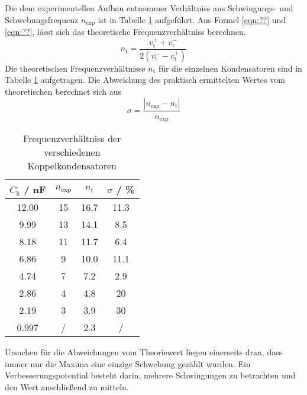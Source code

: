 Die dem experimentellen Aufbau entnommer Verhältniss aus Schwingungs- und Schwebungsfrequenz $n_\text{exp}$ ist in Tabelle \ref{tab:n} aufgeführt. Aus Formel \ref{eqn:??} und \ref{eqn:??}, lässt sich das theoretische Frequenzverhältniss berechnen.
\begin{equation}
  n_\text{t} = \frac{ v_\text{t}^+ + v_\text{t}^- }{2(v_\text{t}^- - v_\text{t}^+)}
  \label{eqn:n_t}
\end{equation}
Die theoretischen Frequenzverhältnisse $n_\text{t}$ für die einzelnen Kondensatoren sind in Tabelle \ref{tab:n} aufgetragen. Die Abweichung des praktisch ermittelten Wertes vom theoretischen berechnet sich aus 
\begin{equation}
  \sigma = \frac{| n_\text{exp} - n_\text{t} |}{n_\text{exp}}
\end{equation}
\begin{table}
  \centering
  \begin{tabular}{c c c c}
    \toprule
    $C_\text{k}$ / nF & $n_\text{exp}$ & $n_\text{t}$ & $\sigma$ / \%	\\
    \midrule
    12.00	& 15	& 16.7	& 11.3	\\
    9.99	& 13 	& 14.1	& 8.5	\\
    8.18	& 11	& 11.7	& 6.4	\\
    6.86	& 9	& 10.0	& 11.1	\\
    4.74	& 7	& 7.2	& 2.9	\\
    2.86	& 4	& 4.8	& 20	\\	
    2.19	& 3 	& 3.9	& 30	\\
    0.997	& /	& 2.3	& /	\\
    \bottomrule
  \end{tabular}
  \caption{Frequenzverhältniss der verschiedenen Koppelkondensatoren}
  \label{tab:n}
\end{table}
Ursachen für die Abweichungen vom Theoriewert liegen einerseits dran, dass immer nur die Maxima eine einzige Schwebung gezählt wurden. Ein Verbesserungspotential besteht darin, mehrere Schwingungen zu betrachten und den Wert anschließend zu mitteln.
